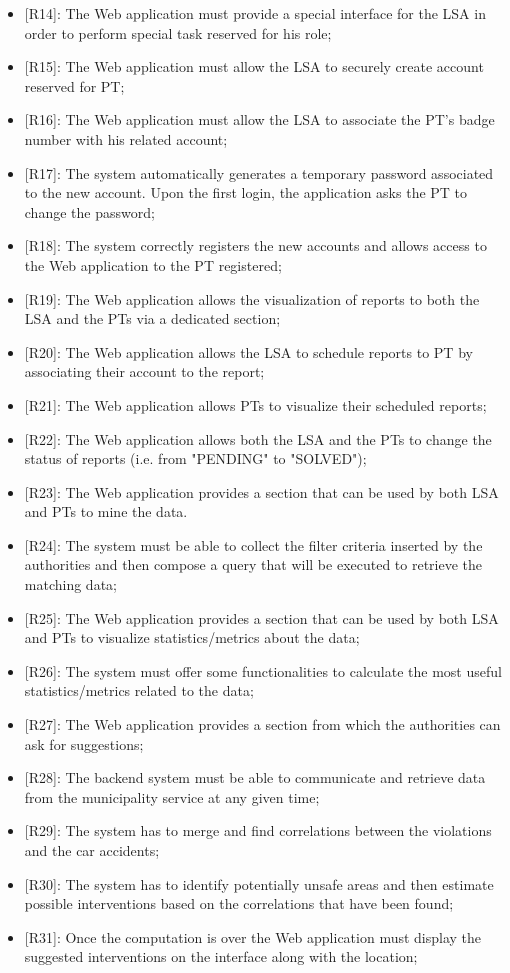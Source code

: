 \begin{itemize}
    \item {[R14]}: The Web application must provide a special interface for the LSA in order to perform special task reserved for his role;
    \item {[R15]}: The Web application must allow the LSA to securely create account reserved for PT;
    \item {[R16]}: The Web application must allow the LSA to associate the PT's badge number with his related account;
    \item {[R17]}: The system automatically generates a temporary password associated to the new account. Upon the first login, the application asks the PT to change the password;
    \item {[R18]}: The system correctly registers the new accounts and allows access to the Web application to the PT registered;  
    \item {[R19]}: The Web application allows the visualization of reports to both the LSA and the PTs via a dedicated section;
    \item {[R20]}: The Web application allows the LSA to schedule reports to PT by associating their account to the report;
    \item {[R21]}: The Web application allows PTs to visualize their scheduled reports;
    \item {[R22]}: The Web application allows both the LSA and the PTs to change the status of reports (i.e. from "PENDING" to "SOLVED");
    \item {[R23]}: The Web application provides a section that can be used by both LSA and PTs to mine the data.
    \item {[R24]}: The system must be able to collect the filter criteria inserted by the authorities and then compose a query that will be executed to retrieve the matching data;
    \item {[R25]}: The Web application provides a section that can be used by both LSA and PTs to visualize statistics/metrics about the data;
    \item {[R26]}: The system must offer some functionalities to calculate the most useful statistics/metrics related to the data;
    \item {[R27]}: The Web application provides a section from which the authorities can ask for suggestions;
    \item {[R28]}: The backend system must be able to communicate and retrieve data from the municipality service at any given time;
    \item {[R29]}: The system has to merge and find correlations between the violations and the car accidents;
    \item {[R30]}: The system has to identify potentially unsafe areas and then estimate possible interventions based on the correlations that have been found;
    \item {[R31]}: Once the computation is over the Web application must display the suggested interventions on the interface along with the location;
\end{itemize}
